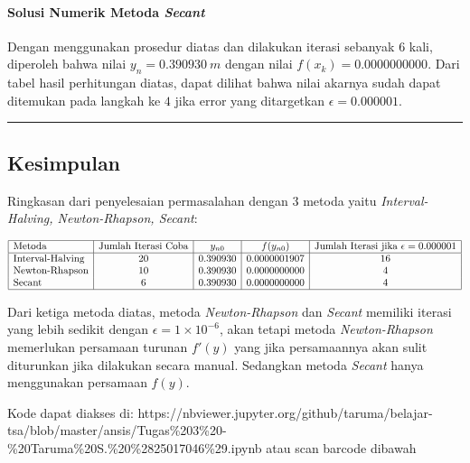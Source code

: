 \documentclass[10pt, a4paper]{article}
\begin{document}
    \paragraph{\texorpdfstring{Solusi Numerik Metoda
\emph{Secant}}{Solusi Numerik Metoda Secant}}\label{solusi-numerik-metoda-secant}

Dengan menggunakan prosedur diatas dan dilakukan iterasi sebanyak \(6\)
kali, diperoleh bahwa nilai \(y_n = 0.390930\ m\) dengan nilai
\(f(x_k) = 0.0000000000\). Dari tabel hasil perhitungan diatas, dapat
dilihat bahwa nilai akarnya sudah dapat ditemukan pada langkah ke \(4\)
jika error yang ditargetkan \(\epsilon = 0.000001\).

    \begin{center}\rule{0.5\linewidth}{\linethickness}\end{center}

\newpage
\subsection{Kesimpulan}\label{kesimpulan}

Ringkasan dari penyelesaian permasalahan dengan 3 metoda yaitu
\emph{Interval-Halving, Newton-Rhapson, Secant}:

\[\begin{array}{|l|c|c|c|c|}
\hline
\text{Metoda} & \text{Jumlah Iterasi Coba} & y_{n0} & f(y_{n0}) & \text{Jumlah Iterasi jika } \epsilon = 0.000001 \\
\hline
\text{Interval-Halving} & 20 & 0.390930 & 0.0000001907 & 16 \\
\text{Newton-Rhapson} & 10 & 0.390930 & 0.0000000000 & 4 \\
\text{Secant} & 6 & 0.390930 & 0.0000000000 & 4 \\\hline
\end{array}
\]

Dari ketiga metoda diatas, metoda \emph{Newton-Rhapson} dan
\emph{Secant} memiliki iterasi yang lebih sedikit dengan
\(\epsilon = 1\times10^{-6}\), akan tetapi metoda \emph{Newton-Rhapson}
memerlukan persamaan turunan \(f'(y)\) yang jika persamaannya akan sulit
diturunkan jika dilakukan secara manual. Sedangkan metoda \emph{Secant}
hanya menggunakan persamaan \(f(y)\).

Kode dapat diakses di: https://nbviewer.jupyter.org/github/taruma/belajar-tsa/blob/master/ansis/Tugas\%203\%20-\%20Taruma\%20S.\%20\%2825017046\%29.ipynb atau scan barcode dibawah
\end{document}
